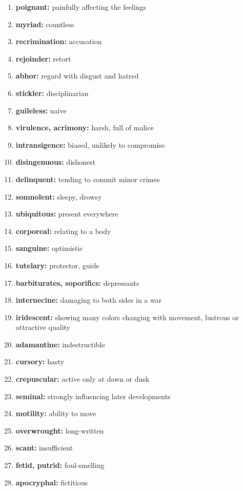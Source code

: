 \documentclass{article}
\begin{document}
\begin{enumerate}
    \item \textbf{poignant: }{painfully affecting the feelings}
    \item \textbf{myriad: }{countless}
    \item \textbf{recrimination: }{accusation}
    \item \textbf{rejoinder: }{retort}
    \item \textbf{abhor: }{regard with disgust and hatred}
    \item \textbf{stickler: }{disciplinarian}
    \item \textbf{guileless: }{naive}
    \item \textbf{virulence, acrimony: }{harsh, full of malice}
    \item \textbf{intransigence: }{biased, unlikely to compromise}
    \item \textbf{disingenuous: }{dishonest}
    \item \textbf{delinquent: }{tending to commit minor crimes}
    \item \textbf{somnolent: }{sleepy, drowsy}
    \item \textbf{ubiquitous: }{present everywhere}
    \item \textbf{corporeal: }{relating to a body}
    \item \textbf{sanguine: }{optimistic}
    \item \textbf{tutelary: }{protector, guide}
    \item \textbf{barbiturates, soporifics: }{depressants}
    \item \textbf{internecine: }{damaging to both sides in a war}
    \item \textbf{iridescent: }{showing many colors changing with movement, lustrous or attractive quality}
    \item \textbf{adamantine: }{indestructible}
    \item \textbf{cursory: }{hasty}
    \item \textbf{crepuscular: }{active only at dawn or dusk}
    \item \textbf{seminal: }{strongly influencing later developments}
    \item \textbf{motility: }{ability to move}
    \item \textbf{overwrought: }{long-written}
    \item \textbf{scant: }{insufficient}
    \item \textbf{fetid, putrid: }{foul-smelling}
    \item \textbf{apocryphal: }{fictitious}

\end{enumerate}
\end{document}
